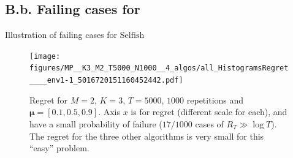 \documentclass[12pt,english,ignorenonframetext,aspectratio=169,]{beamer}
\begin{document}
\subsection{\hfill{}B.b. Failing cases for \Selfish\hfill{}}

\begin{frame}[plain]{Illustration of failing cases for
\(\mathrm{Selfish}\)}

\begin{figure}[h!]
\texttt{[image: figures/MP\_\_K3\_M2\_T5000\_N1000\_\_4\_algos/all\_HistogramsRegret\_\_\_\_env1-1\_5016720151160452442.pdf]}
\caption{\footnotesize{Regret for $M=2$, $K=3$, $T=5000$, $1000$ repetitions and $\boldsymbol{\mu} = [0.1, 0.5, 0.9]$. Axis $x$ is for regret (different scale for each), and \textcolor{bluegreen}{\Selfish{}} have a small probability of failure ($17/1000$ cases of $R_T \gg \log T$). The regret for the three other algorithms is very small for this ``easy'' problem.}}
\end{figure}

\end{frame}
\end{document}
